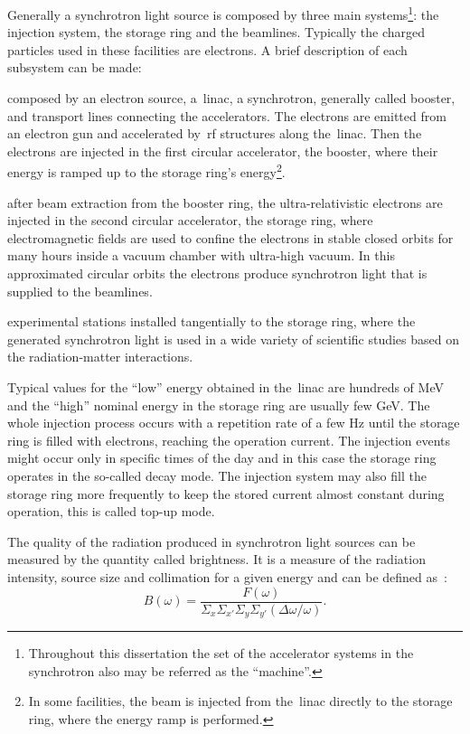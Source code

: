 Generally a synchrotron light source is composed by three main systems\footnote{Throughout this dissertation the set of the accelerator systems in the synchrotron also may be referred as the ``machine''.}: the injection system, the storage ring and the beamlines. Typically the charged particles used in these facilities are electrons. A brief description of each subsystem can be made:
\begin{description}[align=left]
    \item[Injection system:] composed by an electron source, a~\gls{linac}, a synchrotron, generally called booster, and transport lines connecting the accelerators. The electrons are emitted from an electron gun and accelerated by~\gls{rf} structures along the~\gls{linac}. Then the electrons are injected in the first circular accelerator, the booster, where their energy is ramped up to the storage ring's energy\footnote{In some facilities, the beam is injected from the~\gls{linac} directly to the storage ring, where the energy ramp is performed.}.
    \item[Storage ring:] after beam extraction from the booster ring, the ultra-relativistic electrons are injected in the second circular accelerator, the storage ring, where electromagnetic fields are used to confine the electrons in stable closed orbits for many hours inside a vacuum chamber with ultra-high vacuum. In this approximated circular orbits the electrons produce synchrotron light that is supplied to the beamlines.
    \item[Beamlines:] experimental stations installed tangentially to the storage ring, where the generated synchrotron light is used in a wide variety of scientific studies based on the radiation-matter interactions.
\end{description}

Typical values for the ``low'' energy obtained in the~\gls{linac} are hundreds of \si{\mega\electronvolt} and the ``high'' nominal energy in the storage ring are usually few \si{\giga\electronvolt}. The whole injection process occurs with a repetition rate of a few \si{\hertz} until the storage ring is filled with electrons, reaching the operation current. The injection events might occur only in specific times of the day and in this case the storage ring operates in the so-called decay mode. The injection system may also fill the storage ring more frequently to keep the stored current almost constant during operation, this is called top-up mode.

The quality of the radiation produced in synchrotron light sources can be measured by the quantity called brightness. It is a measure of the radiation intensity, source size and collimation for a given energy and can be defined as~\cite{huang2013}:
\begin{equation}
    B(\omega) = \dfrac{F(\omega)}{\Sigma_x \Sigma_{x'} \Sigma_y \Sigma_{y'} \left(\Delta \omega /\omega\right)}.
\end{equation}

